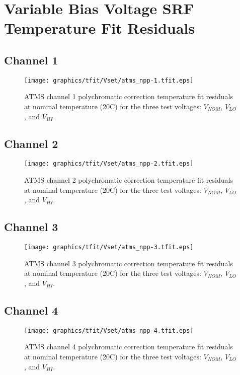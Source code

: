 \section{Variable Bias Voltage SRF Temperature Fit Residuals}
\label{app:Vset_tfit_data_plots}

\subsection{Channel 1}
\begin{figure}[H]
  \label{fig:Vset.ch1_tfit}
  \centering
  \texttt{[image: graphics/tfit/Vset/atms\_npp-1.tfit.eps]}
  \caption{ATMS channel 1 polychromatic correction temperature fit residuals at nominal temperature (20\textdegree{}C) for the three test voltages: $V_{NOM}$, $V_{LO}$, and $V_{HI}$.}
\end{figure}

\subsection{Channel 2}
\begin{figure}[H]
  \label{fig:Vset.ch2_tfit}
  \centering
  \texttt{[image: graphics/tfit/Vset/atms\_npp-2.tfit.eps]}
  \caption{ATMS channel 2 polychromatic correction temperature fit residuals at nominal temperature (20\textdegree{}C) for the three test voltages: $V_{NOM}$, $V_{LO}$, and $V_{HI}$.}
\end{figure}

\subsection{Channel 3}
\begin{figure}[H]
  \label{fig:Vset.ch3_tfit}
  \centering
  \texttt{[image: graphics/tfit/Vset/atms\_npp-3.tfit.eps]}
  \caption{ATMS channel 3 polychromatic correction temperature fit residuals at nominal temperature (20\textdegree{}C) for the three test voltages: $V_{NOM}$, $V_{LO}$, and $V_{HI}$.}
\end{figure}

\subsection{Channel 4}
\begin{figure}[H]
  \label{fig:Vset.ch4_tfit}
  \centering
  \texttt{[image: graphics/tfit/Vset/atms\_npp-4.tfit.eps]}
  \caption{ATMS channel 4 polychromatic correction temperature fit residuals at nominal temperature (20\textdegree{}C) for the three test voltages: $V_{NOM}$, $V_{LO}$, and $V_{HI}$.}
\end{figure}

